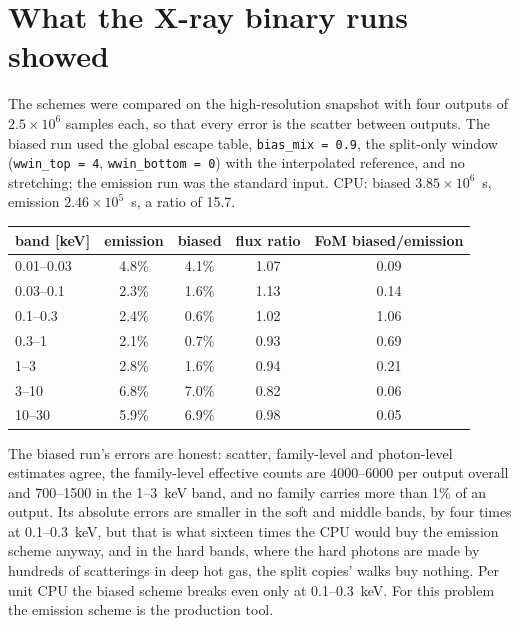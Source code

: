 \documentclass[11pt]{article}
\newcommand{\key}[1]{\texttt{#1}}
\begin{document}
\section{What the X-ray binary runs showed}
\label{sec:xrb}

The schemes were compared on the high-resolution snapshot with four outputs of
$2.5\times10^6$ samples each, so that every error is the scatter between outputs. The
biased run used the global escape table, \key{bias\_mix = 0.9}, the split-only window
(\key{wwin\_top = 4}, \key{wwin\_bottom = 0}) with the interpolated reference, and no
stretching; the emission run was the standard input. CPU: biased $3.85\times10^6$~s,
emission $2.46\times10^5$~s, a ratio of 15.7.

\begin{center}
\begin{tabular}{@{}lcccc@{}}
\toprule
band [keV] & emission & biased & flux ratio & FoM biased/emission \\
\midrule
0.01--0.03 & 4.8\% & 4.1\% & 1.07 & 0.09 \\
0.03--0.1  & 2.3\% & 1.6\% & 1.13 & 0.14 \\
0.1--0.3   & 2.4\% & 0.6\% & 1.02 & 1.06 \\
0.3--1     & 2.1\% & 0.7\% & 0.93 & 0.69 \\
1--3       & 2.8\% & 1.6\% & 0.94 & 0.21 \\
3--10      & 6.8\% & 7.0\% & 0.82 & 0.06 \\
10--30     & 5.9\% & 6.9\% & 0.98 & 0.05 \\
\bottomrule
\end{tabular}
\end{center}

The biased run's errors are honest: scatter, family-level and photon-level estimates
agree, the family-level effective counts are 4000--6000 per output overall and
700--1500 in the 1--3~keV band, and no family carries more than 1\% of an output. Its
absolute errors are smaller in the soft and middle bands, by four times at 0.1--0.3~keV,
but that is what sixteen times the CPU would buy the emission scheme anyway, and in the
hard bands, where the hard photons are made by hundreds of scatterings in deep hot gas,
the split copies' walks buy nothing. Per unit CPU the biased scheme breaks even only at
0.1--0.3~keV. For this problem the emission scheme is the production tool.
\end{document}

